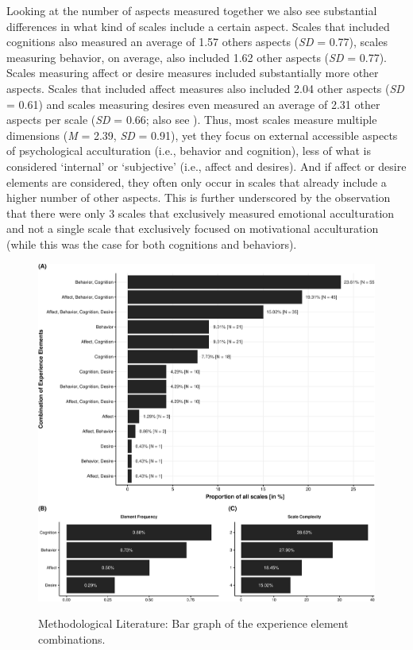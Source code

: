 Looking at the number of aspects measured together we also see
substantial differences in what kind of scales include a certain aspect.
Scales that included cognitions also measured an average of 1.57 others
aspects (\textit{SD} = 0.77), scales measuring behavior, on average,
also included 1.62 other aspects (\textit{SD} = 0.77). Scales measuring
affect or desire measures included substantially more other aspects.
Scales that included affect measures also included 2.04 other aspects
(\textit{SD} = 0.61) and scales measuring desires even measured an
average of 2.31 other aspects per scale (\textit{SD} = 0.66; also see
). Thus, most scales measure multiple
dimensions (\textit{M} = 2.39, \textit{SD} = 0.91), yet they focus on
external accessible aspects of psychological acculturation (i.e.,
behavior and cognition), less of what is considered `internal' or
`subjective' (i.e., affect and desires). And if affect or desire
elements are considered, they often only occur in scales that already
include a higher number of other aspects. This is further underscored by
the observation that there were only 3 scales that exclusively measured
emotional acculturation and not a single scale that exclusively focused
on motivational acculturation (while this was the case for both
cognitions and behaviors).

\begin{figure}[h]
\centering
\caption{Methodological Literature: Bar graph of the experience element combinations.}
\includegraphics[width=\textwidth]{Figures/ABCDFreq-1}
\label{fig:ElementsScales}
\end{figure}

